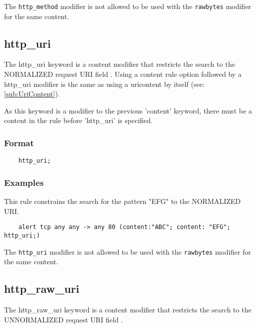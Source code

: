 \documentclass[english]{report}
\newenvironment{note}{
\samepage
    \vspace{10pt}{\textsf{
        {\hspace{7pt}\Huge{$\triangle$\hspace{-12.5pt}{\Large{$^!$}}}}\hspace{5pt}
        {\Large{NOTE}}
    }
    }
   \begin{center}
    \par\vspace{-17pt}

    \begin{lrbox}{\savepar}
    \begin{minipage}[r]{6in}
}
{
    \end{minipage}
    \end{lrbox}
    \fbox{
        \usebox{
            \savepar
	}
    }
    \par\vskip10pt
    \end{center}
}
\newenvironment{note}{
        \begin{rawhtml}
        <p><table border="1"><tr><td><b>
        Note:&nbsp;&nbsp;</b>
        \end{rawhtml}
}{
        \begin{rawhtml}
        </b></td></tr></table></p>
        \end{rawhtml}
}
\begin{document}
\begin{note}

The \texttt{http\_method} modifier is not allowed to be used with the
\texttt{rawbytes} modifier for the same content.

\end{note}

\subsection{http\_uri}
\label{sub:HttpUri}

The http\_uri keyword is a content modifier that restricts the search to the
NORMALIZED request \textsc{URI} field .  Using a content rule option followed
by a http\_uri modifier is the same as using a uricontent by itself (see:
\ref{sub:UriContent}).

As this keyword is a modifier to the previous 'content' keyword, there must be
a content in the rule before 'http\_uri' is specified.

\subsubsection{Format}

\begin{verbatim}
    http_uri;
\end{verbatim}

\subsubsection{Examples}

This rule constrains the search for the pattern "EFG" to the NORMALIZED URI.

\begin{verbatim}
    alert tcp any any -> any 80 (content:"ABC"; content: "EFG"; http_uri;)
\end{verbatim}

\begin{note}

The \texttt{http\_uri} modifier is not allowed to be used with the
\texttt{rawbytes} modifier for the same content.

\end{note}

\subsection{http\_raw\_uri}
\label{sub:RawHttpUri}
The http\_raw\_uri keyword is a content modifier that restricts the search to the
UNNORMALIZED request \textsc{URI} field . 
\end{document}
